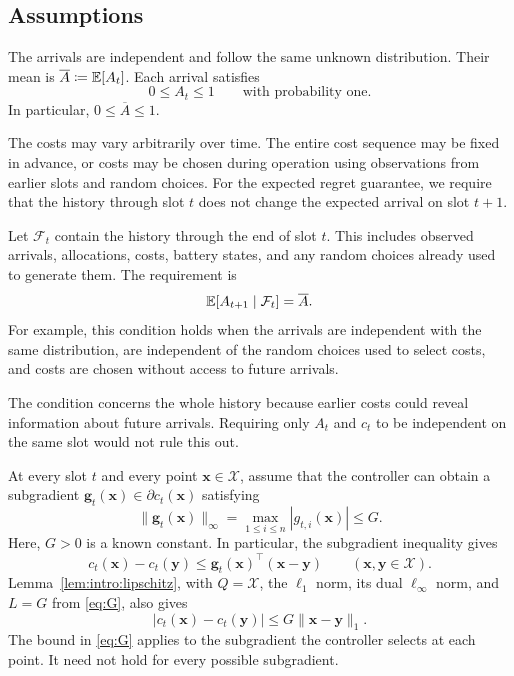 \subsection{Assumptions}\label{Assumptions}

The arrivals are independent and follow the same unknown distribution.
Their mean is $\overline A\coloneqq\mathbb{E}[A_t]$. Each arrival satisfies
\begin{equation}\label{eq:energy:arrival-bound}
0\leq A_t\leq1\qquad\text{with probability one}.
\end{equation}
In particular, $0\leq\overline A\leq1$.

The costs may vary arbitrarily over time. The entire cost sequence may be
fixed in advance, or costs may be chosen during operation using observations
from earlier slots and random choices. For the expected regret guarantee,
we require that the history through slot $t$ does not change the expected
arrival on slot $t+1$.

Let $\mathcal F_t$ contain the history through the end of slot $t$. This
includes observed arrivals, allocations, costs, battery states, and any
random choices already used to generate them. The requirement is
\begin{equation}\label{eq:energy:conditional-mean}
\mathbb{E}[A_{t+1}\mid\mathcal F_t]=\overline A.
\end{equation}
For example, this condition holds when the arrivals are independent with
the same distribution, are independent of the random choices used to select
costs, and costs are chosen without access to future arrivals.

The condition concerns the whole history because earlier costs could
reveal information about future arrivals. Requiring only $A_t$ and $c_t$
to be independent on the same slot would not rule this out.

At every slot $t$ and every point $\mathbf{x}\in\mathcal X$, assume that the
controller can obtain a subgradient
$\mathbf{g}_t(\mathbf{x})\in\partial c_t(\mathbf{x})$ satisfying
\begin{equation}\label{eq:G}
\|\mathbf{g}_t(\mathbf{x})\|_\infty
=\max_{1\leq i\leq n}|g_{t,i}(\mathbf{x})|\leq G.
\end{equation}
Here, $G>0$ is a known constant.
In particular, the subgradient inequality gives
\begin{equation}\label{eq:energy:subgradient}
c_t(\mathbf{x})-c_t(\mathbf{y})\leq \mathbf{g}_t(\mathbf{x})^\top(\mathbf{x}-\mathbf{y})
\qquad(\mathbf{x},\mathbf{y}\in\mathcal X).
\end{equation}
Lemma~\ref{lem:intro:lipschitz}, with $Q=\mathcal X$, the $\ell_1$ norm,
its dual $\ell_\infty$ norm, and $L=G$ from \eqref{eq:G}, also gives
\begin{equation}\label{eq:energy:lipschitz}
|c_t(\mathbf{x})-c_t(\mathbf{y})|\leq G\|\mathbf{x}-\mathbf{y}\|_1.
\end{equation}
The bound in \eqref{eq:G} applies to the subgradient the controller selects
at each point. It need not hold for every possible subgradient.


